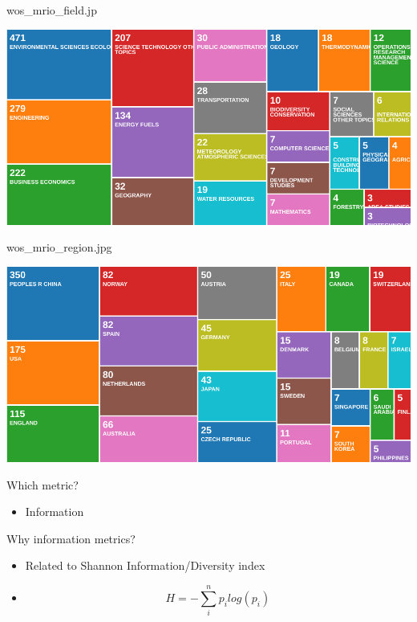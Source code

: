 \documentclass[ignorenonframetext,]{beamer}
\providecommand{\tightlist}{%
  \setlength{\itemsep}{0pt}\setlength{\parskip}{0pt}}
\begin{document}
\begin{frame}{wos\_mrio\_field.jp}
\protect\hypertarget{wos_mrio_field.jp}{}

\begin{center}\includegraphics[width=0.5\linewidth]{images/wos_mrio_field} \end{center}

\end{frame}

\begin{frame}{wos\_mrio\_region.jpg}
\protect\hypertarget{wos_mrio_region.jpg}{}

\begin{center}\includegraphics[width=0.5\linewidth]{images/wos_mrio_region} \end{center}

\end{frame}

\begin{frame}{Which metric?}
\protect\hypertarget{which-metric}{}

\begin{itemize}
\tightlist
\item
  Information
\end{itemize}

\end{frame}

\begin{frame}{Why information metrics?}
\protect\hypertarget{why-information-metrics}{}

\begin{itemize}
\tightlist
\item
  Related to Shannon Information/Diversity index
\item
  \[H = -\sum_i^n p_i log(p_i)\]
\end{itemize}

\end{frame}
\end{document}
